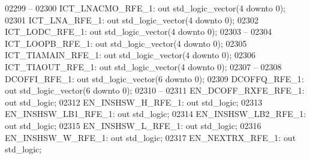 \begin{DoxyCode}
02299 \textcolor{keyword}{    --}
02300     ICT\_LNACMO\_RFE\_1:   \textcolor{keywordflow}{out} \textcolor{comment}{std\_logic\_vector}(\textcolor{vhdllogic}{}\textcolor{vhdllogic}{4} \textcolor{keywordflow}{downto} \textcolor{vhdllogic}{}\textcolor{vhdllogic}{0});
02301     ICT\_LNA\_RFE\_1:  \textcolor{keywordflow}{out} \textcolor{comment}{std\_logic\_vector}(\textcolor{vhdllogic}{}\textcolor{vhdllogic}{4} \textcolor{keywordflow}{downto} \textcolor{vhdllogic}{}\textcolor{vhdllogic}{0});
02302     ICT\_LODC\_RFE\_1: \textcolor{keywordflow}{out} \textcolor{comment}{std\_logic\_vector}(\textcolor{vhdllogic}{}\textcolor{vhdllogic}{4} \textcolor{keywordflow}{downto} \textcolor{vhdllogic}{}\textcolor{vhdllogic}{0});
02303 \textcolor{keyword}{    --}
02304     ICT\_LOOPB\_RFE\_1:    \textcolor{keywordflow}{out} \textcolor{comment}{std\_logic\_vector}(\textcolor{vhdllogic}{}\textcolor{vhdllogic}{4} \textcolor{keywordflow}{downto} \textcolor{vhdllogic}{}\textcolor{vhdllogic}{0});
02305     ICT\_TIAMAIN\_RFE\_1:  \textcolor{keywordflow}{out} \textcolor{comment}{std\_logic\_vector}(\textcolor{vhdllogic}{}\textcolor{vhdllogic}{4} \textcolor{keywordflow}{downto} \textcolor{vhdllogic}{}\textcolor{vhdllogic}{0});
02306     ICT\_TIAOUT\_RFE\_1:   \textcolor{keywordflow}{out} \textcolor{comment}{std\_logic\_vector}(\textcolor{vhdllogic}{}\textcolor{vhdllogic}{4} \textcolor{keywordflow}{downto} \textcolor{vhdllogic}{}\textcolor{vhdllogic}{0});
02307 \textcolor{keyword}{    --}
02308     DCOFFI\_RFE\_1:   \textcolor{keywordflow}{out} \textcolor{comment}{std\_logic\_vector}(\textcolor{vhdllogic}{}\textcolor{vhdllogic}{6} \textcolor{keywordflow}{downto} \textcolor{vhdllogic}{}\textcolor{vhdllogic}{0});
02309     DCOFFQ\_RFE\_1:   \textcolor{keywordflow}{out} \textcolor{comment}{std\_logic\_vector}(\textcolor{vhdllogic}{}\textcolor{vhdllogic}{6} \textcolor{keywordflow}{downto} \textcolor{vhdllogic}{}\textcolor{vhdllogic}{0});
02310 \textcolor{keyword}{    --}
02311     EN\_DCOFF\_RXFE\_RFE\_1:    \textcolor{keywordflow}{out} \textcolor{comment}{std\_logic};
02312     EN\_INSHSW\_H\_RFE\_1:  \textcolor{keywordflow}{out} \textcolor{comment}{std\_logic};
02313     EN\_INSHSW\_LB1\_RFE\_1:    \textcolor{keywordflow}{out} \textcolor{comment}{std\_logic};
02314     EN\_INSHSW\_LB2\_RFE\_1:    \textcolor{keywordflow}{out} \textcolor{comment}{std\_logic};
02315     EN\_INSHSW\_L\_RFE\_1:  \textcolor{keywordflow}{out} \textcolor{comment}{std\_logic};
02316     EN\_INSHSW\_W\_RFE\_1:  \textcolor{keywordflow}{out} \textcolor{comment}{std\_logic};
02317     EN\_NEXTRX\_RFE\_1:    \textcolor{keywordflow}{out} \textcolor{comment}{std\_logic};

\end{DoxyCode}
